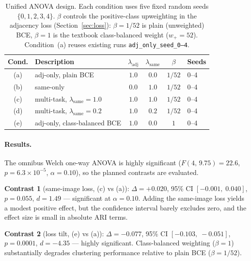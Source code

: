 \documentclass[12pt, a4paper]{article}
\begin{document}
\begin{table}[h]
\centering
\begin{tabular}{clcccl}
\toprule
\textbf{Cond.} & \textbf{Description} & $\lambda_{\text{adj}}$ & $\lambda_{\text{same}}$ & $\beta$ & \textbf{Seeds} \\
\midrule
(a) & adj-only, plain BCE                      & $1.0$ & $0.0$ & $1/52$ & 0--4 \\
(b) & same-only                                & $0.0$ & $1.0$ & $1/52$ & 0--4 \\
(c) & multi-task, $\lambda_{\text{same}}=1.0$  & $1.0$ & $1.0$ & $1/52$ & 0--4 \\
(d) & multi-task, $\lambda_{\text{same}}=0.2$  & $1.0$ & $0.2$ & $1/52$ & 0--4 \\
(e) & adj-only, class-balanced BCE             & $1.0$ & $0.0$ & $1$    & 0--4 \\
\bottomrule
\end{tabular}
\caption{Unified ANOVA design. Each condition uses five fixed random seeds $\{0,1,2,3,4\}$.
$\beta$ controls the positive-class upweighting in the adjacency loss
(Section~\ref{sec:loss}): $\beta = 1/52$ is plain (unweighted) BCE,
$\beta = 1$ is the textbook class-balanced weight ($w_{+} = 52$).
Condition~(a) reuses existing runs \texttt{adj\_only\_seed\_0--4}.}
\label{tab:anova-design}
\end{table}

\paragraph{Results.}



The omnibus Welch one-way ANOVA is highly significant
($F(4,\,9.75) = 22.6$, $p = 6.3 \times 10^{-5}$, $\alpha = 0.10$),
so the planned contrasts are evaluated.





\textbf{Contrast 1} (same-image loss, (c) vs (a)): $\Delta = +0.020$,
95\% CI $[-0.001,\;0.040]$, $p = 0.055$, $d = 1.49$ — significant at
$\alpha = 0.10$. Adding the same-image loss yields a modest positive
effect, but the confidence interval barely excludes zero, and the
effect size is small in absolute ARI terms.

\textbf{Contrast 2} (loss tilt, (e) vs (a)): $\Delta = -0.077$,
95\% CI $[-0.103,\;-0.051]$, $p = 0.0001$, $d = -4.35$ — highly
significant. Class-balanced weighting ($\beta=1$) substantially
degrades clustering performance relative to plain BCE ($\beta=1/52$).
\end{document}
